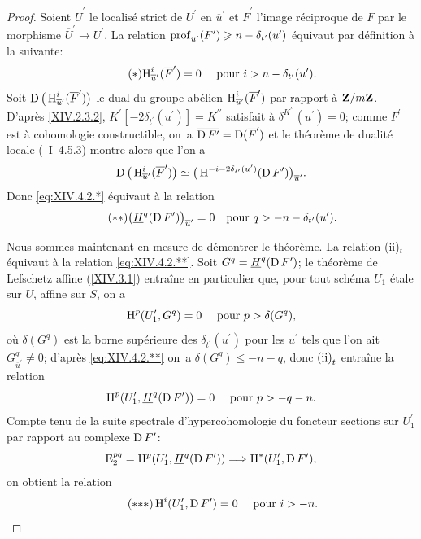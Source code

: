 \begin{proof}
Soient $\overline{U}^{\prime}$ le localis\'e strict de $U^{\prime}$ en $\overline{u}^{\prime}$ et $\overline{F}^{\prime}$ l'image r\'eciproque de $F$ par le morphisme $\overline{U}^{\prime}\to U^{\prime}$. La relation $\operatorname{prof}_{u^{\prime}}(F^{\prime})\geqslant n-\delta_{t^{\prime}}(u^{\prime})$ \'equivaut par d\'efinition \`a la suivante:
\begin{equation*} \label{eq:XIV.4.2.*} \tag{$*$} {\operatorname{H}_{\overline{u}^{\prime}}^{i}(\overline{F}^{\prime})=0\quad\textrm{ pour }i>n-\delta_{t^{\prime}}(u^{\prime}).}
\end{equation*}
Soit $\operatorname{D}\big(\operatorname{H}_{\overline{u}^{\prime}}^{i}(\overline{F}^{\prime})\big)$ le dual du groupe ab\'elien $\operatorname{H}_{\overline{u}^{\prime}}^{i}(\overline{F}^{\prime})$ par rapport \`a $\mathbf{Z}/m\mathbf{Z}$. D'apr\`es \ref{XIV.2.3.2}, $K^{\prime}[-2\delta_{t^{\prime}}(u^{\prime})]=K^{\prime\prime}$ satisfait \`a $\delta^{K^{\prime\prime}}(u^{\prime})=0$; comme $F^{\prime}$ est \`a cohomologie constructible, on~a $\overline{\operatorname{D} F^{\prime}}=\operatorname{D}(\overline{F}^{\prime})$ et le th\'eor\`eme de dualit\'e locale (~I~4.5.3) montre alors que l'on a
$$
\operatorname{D}\big(\operatorname{H}_{\overline{u}^{\prime}}^{i}(\overline{F}^{\prime})\big) \simeq\big(\operatorname{H}^{-i-2\delta_{t^{\prime}}(u^{\prime})}(\operatorname{D} F^{\prime})\big)_{\overline{u}^{\prime}}.
$$
Donc \eqref{eq:XIV.4.2.*} \'equivaut \`a la relation
\begin{equation*} \label{eq:XIV.4.2.**} \tag{$**$}
\big(\underline{H}^{q}(\operatorname{D} F^{\prime})\big)_{\overline{u}^{\prime}}=0\quad\text{pour }q>-n-\delta_{t^{\prime}}(u^{\prime}).
\end{equation*}

Nous sommes maintenant en mesure de d\'emontrer le th\'eor\`eme. La relation \textup{(ii)}$_{t}$ \'equivaut \`a la relation \eqref{eq:XIV.4.2.**}. Soit $G^{q}=\underline{H}^{q}(\operatorname{D} F^{\prime})$; le th\'eor\`eme de Lefschetz affine (\ref{XIV.3.1}) entra\^ine en particulier que, pour tout sch\'ema $U_{1}$ \'etale sur $U$, affine sur $S$, on a
$$
\operatorname{H}^{p}(U_{1}^{\prime}, G^{q})=0\quad\textrm{ pour }p>\delta(G^{q}),
$$
o\`u $\delta(G^{q})$ est la borne sup\'erieure des $\delta_{t^{\prime}}(u^{\prime})$ pour les $u^{\prime}$ tels que l'on ait $G_{\overline{u}^{\prime}}^{q}\neq 0$; d'apr\`es \eqref{eq:XIV.4.2.**} on~a $\delta(G^{q})\leq -n-q$, donc $\textup{(ii)}_{t}$ entra\^ine la relation
$$
\operatorname{H}^{p}(U_{1}^{\prime}, \underline{H}^{q}(\operatorname{D} F^{\prime}))=0\quad\textrm{ pour }p>-q-n.
$$
Compte tenu de la suite spectrale d'hypercohomologie du foncteur \og sections sur $U_{1}^{\prime}$\fg par rapport au complexe $\operatorname{D} F^{\prime}$:
$$
\E_{2}^{pq}=\H^{p}(U_{1}^{\prime}, \underline{H}^{q}(\D F^{\prime}))\To\H^{\ast}(U_{1}^{\prime}, \D F^{\prime}),
$$
on obtient la relation
\begin{equation*} \label{eq:XIV.4.2.***} \tag{${*}{*}{*}$}
\H^{i}(U_{1}^{\prime}, \D F^{\prime})=0\quad\textrm{ pour }i>-n.
\end{equation*}


\end{proof}
